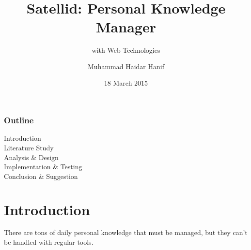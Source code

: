 \documentclass[10pt, compress]{beamer}
\title{Satellid: Personal Knowledge Manager}
\subtitle{with Web Technologies}
\date{18 March 2015}
\author{Muhammad Haidar Hanif}
\institute{Informatics Engineering - Gunadarma University}
\begin{document}

\maketitle


\begin{frame}[fragile]
  \frametitle{Outline}

  \begin{description}
    \item[Introduction]
    \item[Literature Study]
    \item[Analysis \& Design]
    \item[Implementation \& Testing]
    \item[Conclusion \& Suggestion]
  \end{description}

\end{frame}


\section{Introduction}


\begin{frame}[fragile]

  \begin{center}
  There are tons of \alert{daily personal knowledge} that must be managed,
  but they can't be handled with regular tools.
  \end{center}

\end{frame}

\end{document}
